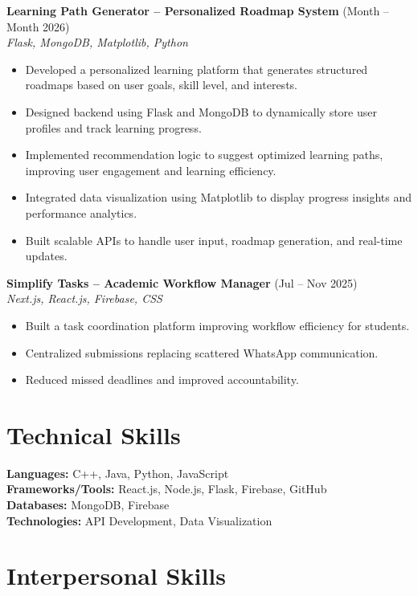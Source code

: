 \documentclass[a4paper,10pt]{article}
\begin{document}
\textbf{Learning Path Generator – Personalized Roadmap System} \hfill (Month -- Month 2026) \\
\textit{Flask, MongoDB, Matplotlib, Python}
\begin{itemize}[leftmargin=*]
\item Developed a personalized learning platform that generates structured roadmaps based on user goals, skill level, and interests.
\item Designed backend using Flask and MongoDB to dynamically store user profiles and track learning progress.
\item Implemented recommendation logic to suggest optimized learning paths, improving user engagement and learning efficiency.
\item Integrated data visualization using Matplotlib to display progress insights and performance analytics.
\item Built scalable APIs to handle user input, roadmap generation, and real-time updates.
\end{itemize}

\textbf{Simplify Tasks – Academic Workflow Manager} \hfill (Jul -- Nov 2025) \\
\textit{Next.js, React.js, Firebase, CSS}
\begin{itemize}[leftmargin=*]
\item Built a task coordination platform improving workflow efficiency for students.
\item Centralized submissions replacing scattered WhatsApp communication.
\item Reduced missed deadlines and improved accountability.
\end{itemize}

\section*{Technical Skills}

\textbf{Languages:} C++, Java, Python, JavaScript \\
\textbf{Frameworks/Tools:} React.js, Node.js, Flask, Firebase, GitHub \\
\textbf{Databases:} MongoDB, Firebase \\
\textbf{Technologies:} API Development, Data Visualization

\section*{Interpersonal Skills}
\end{document}
